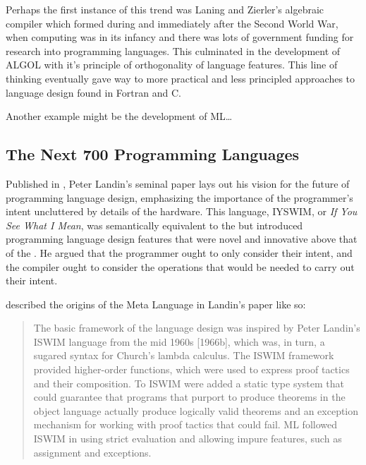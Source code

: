 	Perhaps the first instance of this trend was Laning and Zierler's algebraic compiler
	which formed during and immediately after the Second World War, when computing was
	in its infancy and there was lots of government funding for research into programming languages.
	This culminated in the development of ALGOL with it's principle of orthogonality of language
	features.
	This line of thinking eventually gave way to more practical and less principled approaches to
	language design found in Fortran and C.

	Another example might be the development of ML\dots {}
\fi

\subsection{The Next 700 Programming Languages}

Published in \citeyear{landin_next_700_prog_langs_1966},
Peter Landin's seminal paper  lays out his vision for
the future of programming language design, emphasizing the importance of the programmer's intent
uncluttered by details of the hardware.
This language, IYSWIM, or \textit{If You See What I Mean}, was semantically
equivalent to the \lambdacalc but introduced programming language design features
that were novel and innovative above that of the \lambdacalc.
He argued that the programmer ought to only consider their intent, and the compiler ought to
consider the operations that would be needed to carry out their intent.

\citeauthor{hopl_history_of_ml_2020} described the origins of the Meta Language in Landin's paper
like so\cite{hopl_history_of_ml_2020}:

\begin{quotation}
	The basic framework of the language design was inspired by Peter Landin’s ISWIM language
	from the mid 1960s [1966b], which was, in turn, a sugared syntax for Church’s lambda calculus. The
	ISWIM framework provided higher-order functions, which were used to express proof tactics and
	their composition. To ISWIM were added a static type system that could guarantee that programs
	that purport to produce theorems in the object language actually produce logically valid theorems
	and an exception mechanism for working with proof tactics that could fail. ML followed ISWIM in
	using strict evaluation and allowing impure features, such as assignment and exceptions.
\end{quotation}

